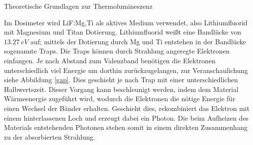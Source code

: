 \documentclass[20pt]{beamer}
\begin{document}
\begin{columns}[onlytextwidth]
\begin{column}{0.5\textwidth}
\begin{block}[equal height group=A]{Theoretische Grundlagen zur Thermolumineszenz}
\begin{multicols}{2}
\begin{large}
          Im Dosimeter wird LiF:Mg,Ti als aktives Medium verwendet, also Lithiumfluorid mit Magnesium und Titan Dotierung. Lithiumfluorid weißt eine Bandlücke von $\SI{13.27}{eV}$ auf; mittels der Dotierung durch Mg und Ti entstehen in der Bandlücke sogenannte Traps. Die Traps können durch Strahlung angeregte Elektronen einfangen. Je nach Abstand zum Valenzband benötigen die Elektronen unterschiedlich viel Energie um dorthin zurückzugelangen, zur Veranschaulichung siehe Abbildung \ref{gap}. Dies geschieht je nach Trap mit einer unterschiedlichen Halbwertszeit. Dieser Vorgang kann beschleunigt werden, indem dem Material Wärmeenergie zugeführt wird, wodurch die Elektronen die nötige Energie für einen Wechsel der Bänder erhalten. Geschieht dies, rekombiniert das Elektron mit einem hinterlassenen Loch und erzeugt dabei ein Photon. Die beim Aufheizen des Materials entstehenden Photonen stehen somit in einem direkten Zusammenhang zu der absorbierten Strahlung.
                  \end{large}
        \end{multicols}
      \end{block}%
    \end{column}%
  \end{columns}%
\end{document}
